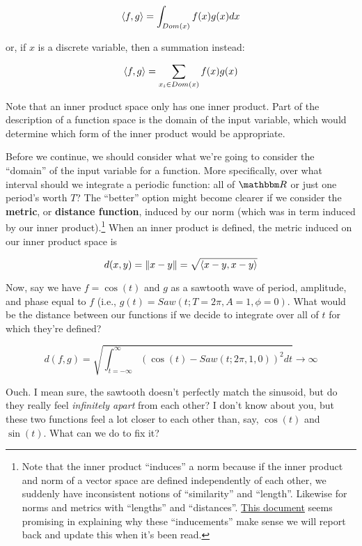 \documentclass[letterpaper,12pt]{report}
\begin{document}
\[\left<f,g\right> = \int_{Dom(x)} f(x)g(x) dx \]

or, if \(x\) is a discrete variable, then a summation instead:

\[\left<f,g\right> = \sum_{x_i \in Dom(x)} f(x)g(x) \]

Note that an inner product space only has one inner product.
Part of the description of a function space is the domain 
of the input variable, which would determine which form
of the inner product would be appropriate.\par

Before we continue, we should consider what we're going to
consider the ``domain'' of the input variable for a function.
More specifically, over what interval should we integrate
a periodic function: all of \(\domain{R}\) or just one period's
worth \(T\)?
The ``better'' option might become clearer if we consider
the \textbf{metric}, or \textbf{distance function},
induced by our norm (which was in term induced by our
inner product).\footnote{
  Note that the inner product ``induces'' a norm
  because if the inner product and norm of a vector space
  are defined independently of each other,
  we suddenly have inconsistent notions of ``similarity''
  and ``length''. Likewise for norms and metrics
  with ``lengths'' and ``distances''.
  \href{http://people.math.gatech.edu/~heil/books/metricbrief.pdf}{This document}
  seems promising in explaining why these ``inducements''
  make sense \textemdash{} we will report back and
  update this when it's been read.
}
When an inner product is defined, the metric 
induced on our inner product space is

\[d(x,y) = \norm{x-y} = \sqrt{\left<x-y,x-y\right>} \]

Now, say we have \(f = \cos(t)\) and \(g\) as a sawtooth
wave of period, amplitude, and phase equal to \(f\)
(i.e., \(g(t) = Saw(t; T = 2\pi, A = 1, \phi = 0)\).
What would be the distance between our functions if
we decide to integrate over all of \(t\) for which
they're defined?

\[d(f,g) = \sqrt{\int_{t = -\infty}^{\infty} \left(\cos(t) - Saw(t; 2\pi, 1, 0)\right)^2 dt} \rightarrow \infty \]

Ouch. I mean sure, the sawtooth doesn't perfectly match
the sinusoid, but do they really feel \emph{infinitely apart}
from each other? I don't know about you, but these two
functions feel a lot closer to each other than, say,
\(\cos(t)\) and \(\sin(t)\). What can we do to fix it?\par
\end{document}
